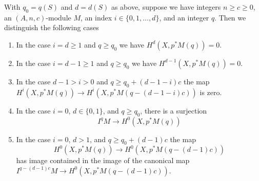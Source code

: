 \begin{lemma}
\label{lemma-vanishing-coh-almost-projective}
With $q_0 = q(S)$ and $d = d(S)$ as above, suppose we have
integers $n \geq c \geq 0$, an $(A, n, c)$-module $M$,
an index $i \in \{0, 1, \ldots, d\}$, and an integer $q$.
Then we distinguish the following cases
\begin{enumerate}
\item In the case $i = d \geq 1$ and $q \geq q_0$ we have
$H^d(X, p^*M(q)) = 0$.
\item In the case $i = d - 1 \geq 1$ and $q \geq q_0$ we have
$H^{d - 1}(X, p^*M(q)) = 0$.
\item In the case $d - 1 > i > 0$ and $q \geq q_0 + (d - 1 - i)c$
the map
$H^i(X, p^*M(q)) \to H^i(X, p^*M(q - (d - 1 - i)c))$
is zero.
\item In the case $i = 0$, $d \in \{0, 1\}$, and $q \geq q_0$, there
is a surjection
$$
I^qM \longrightarrow H^0(X, p^*M(q))
$$
\item In the case $i = 0$, $d > 1$, and $q \geq q_0 + (d - 1)c$ the map
$$
H^0(X, p^*M(q)) \to H^0(X, p^*M(q - (d - 1)c))
$$
has image contained in the image of the canonical map
$I^{q - (d - 1)c}M \to H^0(X, p^*M(q - (d - 1)c))$.
\end{enumerate}
\end{lemma}

